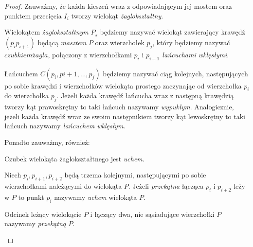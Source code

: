\begin{proof}
  Zauważmy, że każda kieszeń wraz z odpowiadającym jej mostem oraz
  punktem przecięcia $I_i$ tworzy wielokąt \emph{żaglokształtny}.

  \begin{definicja}
    Wielokątem \emph{żaglokształtnym} $P_s$ będziemy nazywać wielokąt
    zawierający krawędź $(p_{i}p_{i+1})$ będącą \emph{masztem} $P$
    oraz wierzchołek $p_j$, który będziemy nazywać $czubkiem żagla$,
    połączony z wierzchołkami $p_i$ i $p_{i+1}$ \emph{łańcuchami
      wklęsłymi}.
  \end{definicja}

  \begin{definicja}
    Łańcuchem $C(p_i,p{i+1},\ldots,p_j)$ będziemy nazywać ciąg
    kolejnych, następujących po sobie krawędzi i wierzchołków
    wielokąta prostego zaczynając od wierzchołka $p_i$ do wierzchołka
    $p_j$. Jeżeli każda krawędź łańcucha wraz z następną krawędzią
    tworzy kąt prawoskrętny to taki łańcuch nazywamy
    \emph{wypukłym}. Analogicznie, jeżeli każda krawędź wraz ze swoim
    następnikiem tworzy kąt lewoskrętny to taki łańcuch nazywamy
    \emph{łańcuchem wklęsłym}.
  \end{definicja}

  Ponadto zauważmy, również:

  \begin{lemat}
    Czubek wielokąta żaglokształtnego jest \emph{uchem}.
  \end{lemat}

  \begin{definicja}
    Niech $p_i, p_{i+1}, p_{i+2}$ będą trzema kolejnymi, następującymi
    po sobie wierzchołkami należącymi do wielokąta $P$. Jeżeli
    \emph{przekątna} łącząca $p_{i}$ i $p_{i+2}$ leży w $P$ to punkt
    $p_i$ nazywamy \emph{uchem} wielokąta $P$.
  \end{definicja}

  \begin{definicja}
    Odcinek leżący wielokącie $P$ i łączący dwa, nie sąsiadujące
    wierzchołki $P$ nazywamy \emph{przekątną} $P$.
  \end{definicja}


\end{proof}

